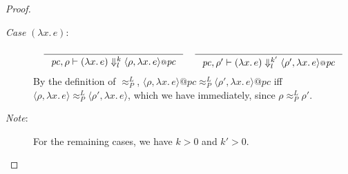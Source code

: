 \documentclass{article}
\makeatletter
\theoremstyle{definition}
\newcommand{\at}{\ensuremath{{\scriptstyle{@}}}}
\newcommand{\pc}{\ensuremath{{\mathit{pc}}}}
\makeatother
\begin{document}
\begin{proof}
\begin{description}
    
  \item[\emph{Case} $(\lambda{x}.\, e)$:]
    \begin{gather*}
      \inference{}{
        \pc, \rho |- (\lambda{x}.\, e) \Downarrow^{k}_{l}
        \langle{\rho, \lambda{x}.\, e\rangle} \at \pc
      }
      \quad
      \inference{}{
        \pc, \rho' |- (\lambda{x}.\, e) \Downarrow^{k'}_{l}
        \langle{\rho', \lambda{x}.\, e\rangle} \at \pc
      }
    \end{gather*}
    By the definition of $\approx^{L}_{P}$,
    $\langle{\rho, \lambda{x}.\, e\rangle} \at \pc
    \approx^{L}_{P}
    \langle{\rho', \lambda{x}.\, e\rangle} \at \pc$
    iff
    $\langle{\rho, \lambda{x}.\, e\rangle}
    \approx^{L}_{P}
    \langle{\rho', \lambda{x}.\, e\rangle}$,
    which we have immediately, since $\rho \approx^{L}_{P} \rho'$.

  \item[\emph{Note}:]
    For the remaining cases, we have $k > 0$ and $k' > 0$.
    

\end{description}
\end{proof}
\end{document}
